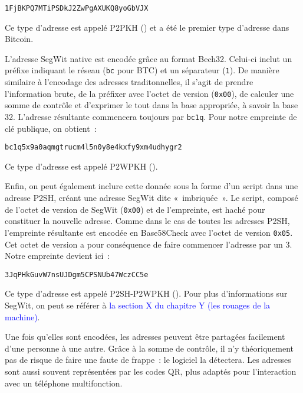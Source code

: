 \begin{Verbatim}[fontsize=\footnotesize]
1FjBKPQ7MTiPSDkJ2ZwPgAXUKQ8yoGbVJX
\end{Verbatim}

Ce type d'adresse est appelé P2PKH () et a été le premier type d'adresse dans Bitcoin.

L'adresse SegWit native est encodée grâce au format Bech32. Celui-ci inclut un préfixe indiquant le réseau (\verb?bc? pour BTC) et un séparateur (\verb?1?). De manière similaire à l'encodage des adresses traditonnelles, il s'agit de prendre l'information brute, de la préfixer avec l'octet de version (\verb?0x00?), de calculer une somme de contrôle et d'exprimer le tout dans la base appropriée, à savoir la base 32. L'adresse résultante commencera toujours par \verb?bc1q?. Pour notre empreinte de clé publique, on obtient~: 

\begin{Verbatim}[fontsize=\footnotesize]
bc1q5x9a0aqmgtrucm4l5n0y8e4kxfy9xm4udhygr2
\end{Verbatim}

Ce type d'adresse est appelé P2WPKH ().

Enfin, on peut également inclure cette donnée sous la forme d'un script dans une adresse P2SH, créant une adresse SegWit dite «~imbriquée~». Le script, composé de l'octet de version de SegWit (\verb?0x00?) et de l'empreinte, est haché pour constituer la nouvelle adresse. Comme dans le cas de toutes les adresses P2SH, l'empreinte résultante est encodée en Base58Check avec l'octet de version \verb?0x05?. Cet octet de version a pour conséquence de faire commencer l'adresse par un 3. Notre empreinte devient ici~:

\begin{Verbatim}[fontsize=\footnotesize]
3JqPHkGuvW7nsUJDgm5CPSNUb47WczCC5e
\end{Verbatim}

Ce type d'adresse est appelé P2SH-P2WPKH (). Pour plus d'informations sur SegWit, on peut se référer à \textcolor{blue}{la section X du chapitre Y (les rouages de la machine)}.

Une fois qu'elles sont encodées, les adresses peuvent être partagées facilement d'une personne à une autre. Grâce à la somme de contrôle, il n'y théoriquement pas de risque de faire une faute de frappe~: le logiciel la détectera. Les adresses sont aussi souvent représentées par les codes QR, plus adaptés pour l'interaction avec un téléphone multifonction.

